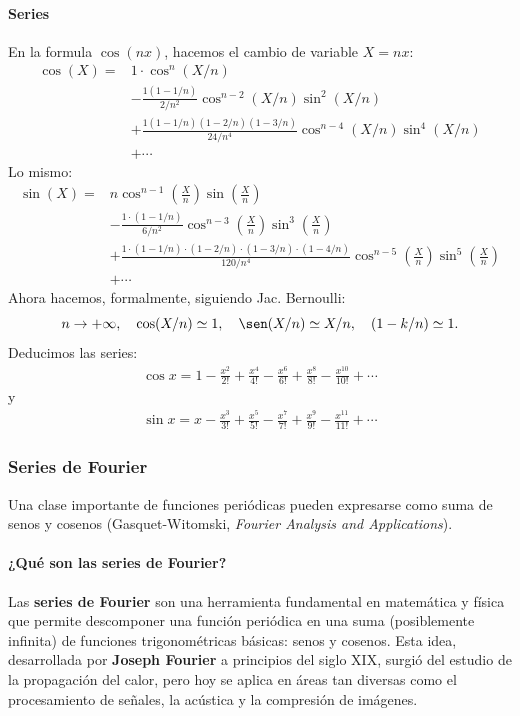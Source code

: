 \documentclass[12pt, a4paper]{article}
\theoremstyle{rioplatense}
\begin{document}
\paragraph{Series}
En la formula $\cos(nx)$, hacemos el cambio de variable $X=nx$:
\begin{align*}
\cos(X) = {} &
1 \cdot \cos^n (X/n) \\
&- \frac{1(1-1/n)}{2/n^2} \cos^{n-2}(X/n) \sin^2 (X/n) \\
&+ \frac{1(1-1/n)(1-2/n)(1-3/n)}{24/n^4} \cos^{n-4} (X/n) \sin^4 (X/n) \\
&+ \cdots
\end{align*}
Lo mismo: 
\begin{align*}
\sin(X) = {} &
n \cos^{n-1} \left(\frac{X}{n}\right) \sin \left(\frac{X}{n}\right) \\
&- \frac{1 \cdot (1-1/n)}{6/n^2} \cos^{n-3} \left(\frac{X}{n}\right) \sin^3 \left(\frac{X}{n}\right) \\
&+ \frac{1 \cdot (1-1/n) \cdot (1-2/n) \cdot (1-3/n) \cdot (1-4/n)}{120/n^4} \cos^{n-5} \left(\frac{X}{n}\right) \sin^5 \left(\frac{X}{n}\right) \\
&+ \cdots
\end{align*}
Ahora hacemos, formalmente, siguiendo Jac. Bernoulli:
\[
n\rightarrow +\infty, \quad
\cos(X/n) \simeq 1, \quad
\sen(X/n) \simeq X/n, \quad 
(1-k/n) \simeq 1.
\]
Deducimos las series:
\begin{align*}
\cos x = 
1 
- \frac{x^2}{2!}
+ \frac{x^4}{4!} 
- \frac{x^6}{6!} 
+ \frac{x^8}{8!} 
- \frac{x^{10}}{10!} 
+ \cdots
\end{align*}
y
\begin{align*}
\sin x = 
x 
- \frac{x^3}{3!} 
+ \frac{x^5}{5!} 
- \frac{x^7}{7!} 
+ \frac{x^9}{9!} 
- \frac{x^{11}}{11!} 
+ \cdots
\end{align*}


\subsubsection{Series de Fourier}
Una clase importante de funciones periódicas pueden expresarse como suma de senos y cosenos (Gasquet-Witomski, \textit{Fourier Analysis and Applications}).

\paragraph{¿Qué son las series de Fourier?}
Las \textbf{series de Fourier} son una herramienta fundamental en matemática y física que permite descomponer una función periódica en una suma (posiblemente infinita) de funciones trigonométricas básicas: senos y cosenos. Esta idea, desarrollada por \textbf{Joseph Fourier} a principios del siglo XIX, surgió del estudio de la propagación del calor, pero hoy se aplica en áreas tan diversas como el procesamiento de señales, la acústica y la compresión de imágenes.
\end{document}
